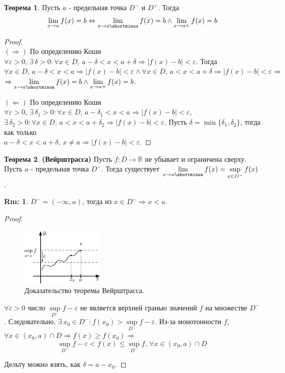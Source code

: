 \documentclass[12pt]{article}
\theoremstyle{definition}
\newtheorem{rem}{Rm:}
\newtheorem{theorem}{Теорема}
\begin{document}
\begin{theorem}
	Пусть $a$ - предельная точка $D^-$ и $D^+$. Тогда $$\lim\limits_{x\to a}f(x) = b \Leftrightarrow \lim\limits_{x\to a\shortminus}f(x) = b \wedge \lim\limits_{x\to a+}f(x) = b$$
\end{theorem}
\begin{proof}\hfill\\
	$(\Rightarrow)$ По определению Коши $\forall \varepsilon > 0,\, \exists \, \delta > 0 \colon \forall x \in D,\, a -\delta < x < a + \delta \Rightarrow |f(x) - b| <\varepsilon$. Тогда\\ 
	$\forall x \in D,\, a -\delta < x < a \Rightarrow |f(x) - b| <\varepsilon \wedge \forall x \in D,\, a < x < a + \delta \Rightarrow |f(x) - b| <\varepsilon \Rightarrow$\\
	 $\Rightarrow \lim\limits_{x\to a\shortminus}f(x) = b \wedge \lim\limits_{x\to a+}f(x) = b$.
	
	$(\Leftarrow)$ По определению Коши $\forall \varepsilon > 0,\, \exists \, \delta_1 > 0 \colon \forall x \in D,\, a -\delta_1 < x < a \Rightarrow |f(x) - b| <\varepsilon$, \\
	 $\exists \, \delta_2 > 0\colon \forall x \in D,\, a < x < a + \delta_2 \Rightarrow |f(x) - b| <\varepsilon$. Пусть $\delta = \min\{\delta_1,\delta_2\}$, тогда как только \\
	 $a - \delta < x < a + \delta, \, x \neq a \Rightarrow |f(x) - b| < \varepsilon$.
\end{proof}

\begin{theorem}\textbf{(Вейрштрасса)}
	Пусть $f\colon D \to \mathbb{R}$ не убывает и ограничена сверху. Пусть $a$ - предельная точка $D^-$. Тогда существует $\lim\limits_{x \to a\shortminus}f(x) = \sup\limits_{x \in D^-} f(x)$.
\end{theorem}
\begin{rem}
	$D^- = (-\infty, a)$, тогда из $x \in D^- \Rightarrow x < a$.
\end{rem}
\begin{proof}
	\begin{figure}[H]
		\centering
		\includegraphics[width=0.35\textwidth]{15_6.eps}
		\caption{Доказательство теоремы Вейрштрасса.}
		\label{15_6}
	\end{figure}

	$\forall \varepsilon > 0$ число $\sup\limits_{D^-}f -\varepsilon$ не является верхней гранью значений $f$ на множестве $D^-$. Следовательно, $\exists \, x_0 \in D^- \colon f(x_0) > \sup\limits_{D^-}f - \varepsilon$. Из-за монотонности $f$, $\forall x \in (x_0, a) \cap D \Rightarrow f(x) \geq f(x_0) \Rightarrow$ 
	$$\sup\limits_{D^-}f - \varepsilon < f(x) \leq \sup\limits_{D^-}f, \, \forall x \in (x_0,a)\cap D$$
	
	Дельту можно взять, как $\delta = a - x_0$.
\end{proof}
\end{document}
